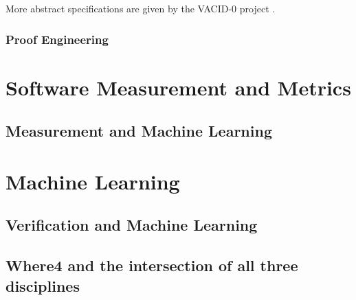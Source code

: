 More abstract specifications are given by the VACID-0 project \cite{Leino10vacid-0:verification}. 

\subsubsection{Proof Engineering}
\label{sub:lrsvmmpe}

\section{Software Measurement and Metrics}
\label{sec:lrmm}

\subsection{Measurement and Machine Learning}
\label{sub:lrmmml}

\section{Machine Learning}
\label{sec:lrml}

\subsection{Verification and Machine Learning}
\label{sub:lrsvml}

\subsection{Where4 and the intersection of all three disciplines}
\label{sub:lrsvmmml}
